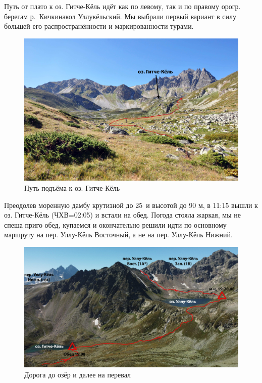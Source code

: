 Путь от плато к оз. Гитче-Кёль идёт как по левому, так и по правому орогр. берегам р.~Кичкинакол Уллукёльский. Мы выбрали первый вариант в силу большей его распространённости и маркированности турами. 

\begin{figure}[h!]
	\centering
	\includegraphics[width=0.7\linewidth]{../pics/DSC_0718}
	\caption{Путь подъёма к оз. Гитче-Кёль}
	\label{fig:DSC_0718}
\end{figure}

Преодолев моренную дамбу крутизной до 25\degree~и высотой до 90 м, в 11:15 вышли к оз. Гитче-Кёль (ЧХВ=02:05) и встали на обед. 
Погода стояла жаркая, мы не спеша приго обед, купаемся и окончательно решили идти по основному маршруту на пер. Уллу-Кёль Восточный, а не на пер. Уллу-Кёль Нижний.



\begin{figure}[h!]
	\centering
	\includegraphics[width=0.7\linewidth]{../pics/ullu_kuel_route}
	\caption{Дорога до озёр и далее на перевал}
	\label{fig:ullu_kuel_route}
\end{figure}

